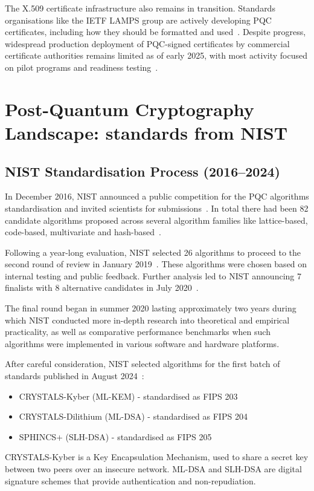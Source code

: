 \documentclass[12pt,a4paper]{article}
\begin{document}
The X.509 certificate infrastructure also remains in transition. Standards organisations like the IETF LAMPS group are actively developing PQC certificates, including how they should be formatted and used~\cite{ietf-lamps-kyber-certs,rfc9881-mldsa-x509}. Despite progress, widespread production deployment of PQC-signed certificates by commercial certificate authorities remains limited as of early 2025, with most activity focused on pilot programs and readiness testing~\cite{digicert-pqc-progress-2024}.


\section{Post-Quantum Cryptography Landscape: standards from NIST}

\subsection{NIST Standardisation Process (2016--2024)}

In December 2016, NIST announced a public competition for the PQC algorithms standardisation and invited scientists for submissions~\cite{nist-pqc-call-2016}. In total there had been 82 candidate algorithms proposed across several algorithm families like lattice-based, code-based, multivariate and hash-based~\cite{nist-pqc-timeline}. 

Following a year-long evaluation, NIST selected 26 algorithms to proceed to the second round of review in January 2019~\cite{nist-round2-2019}. These algorithms were chosen based on internal testing and public feedback. Further analysis led to NIST announcing 7 finalists with 8 alternative candidates in July 2020~\cite{nist-round3-2020}.

The final round began in summer 2020 lasting approximately two years during which NIST conducted more in-depth research into theoretical and empirical practicality, as well as comparative performance benchmarks when such algorithms were implemented in various software and hardware platforms. 

After careful consideration, NIST selected algorithms for the first batch of standards published in August 2024~\cite{nist-fips-203-2024,nist-fips-204-2024,nist-fips-205-2024}:
\begin{itemize}
  \item CRYSTALS-Kyber (ML-KEM) - standardised as FIPS 203
  \item CRYSTALS-Dilithium (ML-DSA) - standardised as FIPS 204
  \item SPHINCS+ (SLH-DSA) - standardised as FIPS 205
\end{itemize}
CRYSTALS-Kyber is a Key Encapsulation Mechanism, used to share a secret key between two peers over an insecure network. ML-DSA and SLH-DSA are digital signature schemes that provide authentication and non-repudiation.
\end{document}

